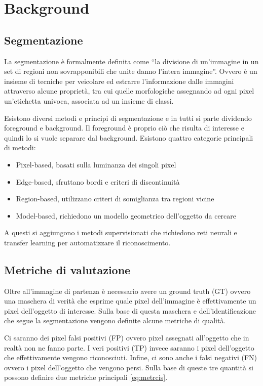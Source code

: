 \documentclass{ieeeojies}
\begin{document}
\section*{Background}

\subsection{Segmentazione}

La segmentazione è formalmente definita come “la divisione di un’immagine in un set di regioni non sovrapponibili che unite danno l’intera immagine”. Ovvero è un insieme di tecniche per veicolare ed estrarre l’informazione dalle immagini attraverso alcune proprietà, tra cui quelle morfologiche assegnando ad ogni pixel un’etichetta univoca, associata ad un insieme di classi. 

Esistono diversi metodi e principi di segmentazione e in tutti si parte dividendo foreground e background. Il foreground è proprio ciò che risulta di interesse e quindi lo si vuole separare dal background. Esistono quattro categorie principali di metodi:

\begin{itemize}
	\item Pixel-based, basati sulla luminanza dei singoli pixel
	\item Edge-based, sfruttano bordi e criteri di discontinuità
	\item Region-based, utilizzano criteri di somiglianza tra regioni vicine
\item Model-based, richiedono un modello geometrico dell’oggetto da cercare
\end{itemize}

A questi si aggiungono i metodi supervisionati che richiedono reti neurali e transfer learning per automatizzare il riconoscimento.

\subsection{Metriche di valutazione}

Oltre all’immagine di partenza è necessario avere un ground truth (GT) ovvero una maschera di verità che esprime quale pixel dell’immagine è effettivamente un pixel dell’oggetto di interesse. Sulla base di questa maschera e dell’identificazione che segue la segmentazione vengono definite alcune metriche di qualità.

Ci saranno dei pixel falsi positivi (FP) ovvero pixel assegnati all’oggetto che in realtà non ne fanno parte. I veri positivi (TP) invece saranno i pixel dell’oggetto che effettivamente vengono riconosciuti. Infine, ci sono anche i falsi negativi (FN) ovvero i pixel dell’oggetto che vengono persi. Sulla base di queste tre quantità si possono definire due metriche principali \cref{eq:metrcis}. 
\end{document}
